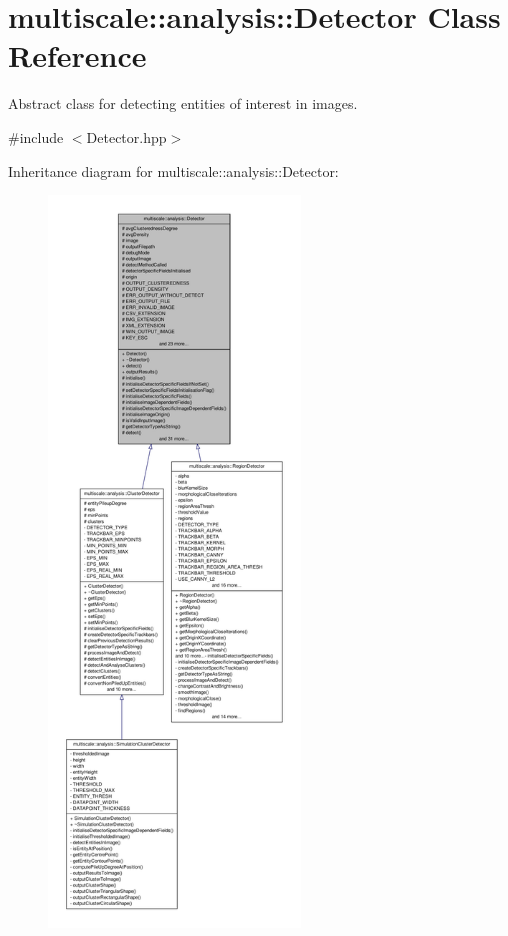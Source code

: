 \hypertarget{classmultiscale_1_1analysis_1_1Detector}{\section{multiscale\-:\-:analysis\-:\-:\-Detector \-Class \-Reference}
\label{classmultiscale_1_1analysis_1_1Detector}
}


\-Abstract class for detecting entities of interest in images.  




{\ttfamily \#include $<$\-Detector.\-hpp$>$}



\-Inheritance diagram for multiscale\-:\-:analysis\-:\-:\-Detector\-:
\nopagebreak
\begin{figure}[H]
\begin{center}
\leavevmode
\includegraphics[height=550pt]{classmultiscale_1_1analysis_1_1Detector__inherit__graph}
\end{center}
\end{figure}


